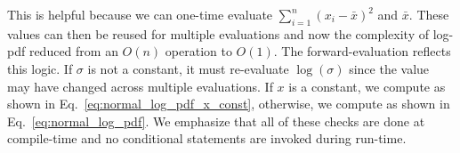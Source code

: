 This is helpful because we can one-time evaluate $\sum\limits_{i=1}^n (x_i - \bar{x})^2$ and $\bar{x}$.
These values can then be reused for multiple evaluations and now the complexity of log-pdf
reduced from an $O(n)$ operation to $O(1)$.
The forward-evaluation reflects this logic.
If $\sigma$ is not a constant, it must re-evaluate $\log(\sigma)$ 
since the value may have changed across multiple evaluations.
If $x$ is a constant, we compute as shown in Eq.~\ref{eq:normal_log_pdf_x_const},
otherwise, we compute as shown in Eq.~\ref{eq:normal_log_pdf}.
We emphasize that all of these checks are done at compile-time 
and no conditional statements are invoked during run-time.
